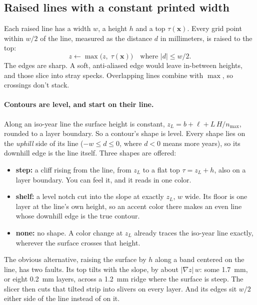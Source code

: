 \documentclass[11pt,letterpaper]{article}
\begin{document}
\subsection{Raised lines with a constant printed width}

Each raised line has a width $w$, a height $h$ and a top $\tau(\mathbf x)$. Every grid point within $w/2$ of the line, measured as the distance $d$ in millimeters, is raised to the top:
\begin{equation}
z \leftarrow \max\big(z,\; \tau(\mathbf x)\big) \quad\text{where } |d| \le w/2 .
\end{equation}
The edges are sharp. A soft, anti-aliased edge would leave in-between heights, and those slice into stray specks. Overlapping lines combine with $\max$, so crossings don't stack.

\paragraph{Contours are level, and start on their line.} Along an iso-year line the surface height is constant, $z_L = b + \ell + L\,H/n_{\max}$, rounded to a layer boundary. So a contour's shape is level. Every shape lies on the \emph{uphill} side of its line ($-w \le d \le 0$, where $d < 0$ means more years), so its downhill edge is the line itself. Three shapes are offered:
\begin{itemize}
\setlength\itemsep{1pt}
\item \textbf{step:} a cliff rising from the line, from $z_L$ to a flat top $\tau = z_L + h$, also on a layer boundary. You can feel it, and it reads in one color.
\item \textbf{shelf:} a level notch cut into the slope at exactly $z_L$, $w$ wide. Its floor is one layer at the line's own height, so an accent color there makes an even line whose downhill edge is the true contour.
\item \textbf{none:} no shape. A color change at $z_L$ already traces the iso-year line exactly, wherever the surface crosses that height.
\end{itemize}
The obvious alternative, raising the surface by $h$ along a band centered on the line, has two faults. Its top tilts with the slope, by about $|\nabla z|\,w$: some 1.7~mm, or eight 0.2~mm layers, across a 1.2~mm ridge where the surface is steep. The slicer then cuts that tilted strip into slivers on every layer. And its edges sit $w/2$ either side of the line instead of on it.
\end{document}
